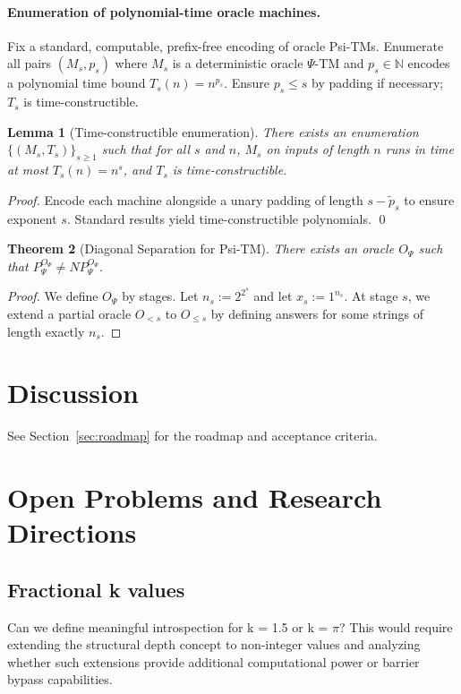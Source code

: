 \documentclass[11pt]{article}
\newtheorem{theorem}{Theorem}[section]
\newtheorem{lemma}[theorem]{Lemma}
\theoremstyle{plain}
\theoremstyle{definition}
\newcommand{\PSi}{\Psi}
\begin{document}
\paragraph{Enumeration of polynomial-time oracle machines.}
Fix a standard, computable, prefix-free encoding of oracle Psi-TMs. Enumerate all pairs $(M_s, p_s)$ where $M_s$ is a deterministic oracle $\PSi$-TM and $p_s\in\mathbb{N}$ encodes a polynomial time bound $T_s(n)=n^{p_s}$. Ensure $p_s\le s$ by padding if necessary; $T_s$ is time-constructible.

\begin{lemma}[Time-constructible enumeration]
\label{lem:enum}
There exists an enumeration $\{(M_s,T_s)\}_{s\ge1}$ such that for all $s$ and $n$, $M_s$ on inputs of length $n$ runs in time at most $T_s(n)=n^{s}$, and $T_s$ is time-constructible.
\end{lemma}
\begin{proof}
Encode each machine alongside a unary padding of length $s-\tilde p_s$ to ensure exponent $s$. Standard results yield time-constructible polynomials. \qed
\end{proof}

\begin{theorem}[Diagonal Separation for Psi-TM]
\label{thm:diagonal}
There exists an oracle $O_\PSi$ such that $P^{O_\PSi}_\PSi \neq NP^{O_\PSi}_\PSi$.
\end{theorem}

\begin{proof}
We define $O_\PSi$ by stages. Let $n_s:=2^{2^{s}}$ and let $x_s:=1^{n_s}$. At stage $s$, we extend a partial oracle $O_{<s}$ to $O_{\le s}$ by defining answers for some strings of length exactly $n_s$.
\end{proof}

\fi

\section{Discussion}\label{sec:discussion}

See Section~\ref{sec:roadmap} for the roadmap and acceptance criteria.

\section{Open Problems and Research Directions}

\subsection{Fractional k values}
Can we define meaningful introspection for k = 1.5 or k = $\pi$? This would require extending the structural depth concept to non-integer values and analyzing whether such extensions provide additional computational power or barrier bypass capabilities.
\end{document}
